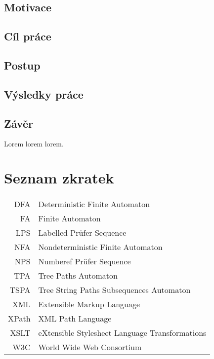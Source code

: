 \documentclass[czech,master]{ctufit-thesis}
\begin{document}
\printabstractpage

\begin{summarypage}
\section*{Motivace}

\lipsum[1][1-8]

\section*{Cíl práce}

\lipsum[2][1-6]

\section*{Postup}

\lipsum[3]

\section*{Výsledky práce}

\lipsum[2]

\section*{Závěr}

\lipsum[1][1-8] Lorem lorem lorem.
\end{summarypage}

\chapter{Seznam zkratek}
	
\begin{tabular}{rl}
DFA & Deterministic Finite Automaton\\
FA & Finite Automaton\\
LPS & Labelled Prüfer Sequence\\
NFA & Nondeterministic Finite Automaton\\
NPS & Numberef Prüfer Sequence\\
TPA & Tree Paths Automaton\\
TSPA & Tree String Paths Subsequences Automaton\\
XML & Extensible Markup Language\\
XPath & XML Path Language\\
XSLT & eXtensible Stylesheet Language Transformations\\
W3C & World Wide Web Consortium
\end{tabular}

\mainmatter
\mainmatterinit



\appendix
\appendixinit



\backmatter




\end{document}
